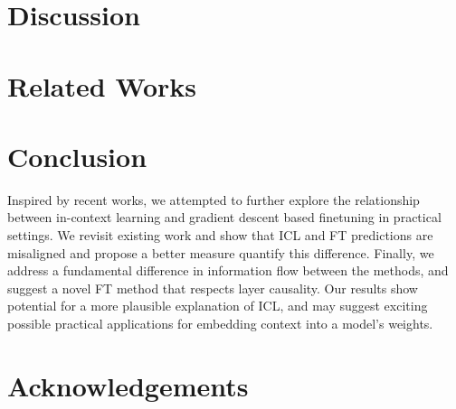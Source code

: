 \documentclass[11pt]{article}
\begin{document}
\section{Discussion}


\section{Related Works} \label{sec:related}


\section{Conclusion}
Inspired by recent works, we attempted to further explore the relationship between in-context learning and gradient descent based finetuning in practical settings.
We revisit existing work and show that ICL and FT predictions are misaligned and propose a better measure quantify this difference.
Finally, we address a fundamental difference in information flow between the methods, and suggest a novel FT method that respects layer causality.
Our results show potential for a more plausible explanation of ICL, and may suggest exciting possible practical applications for embedding context into a model's weights.  
\section{Acknowledgements}





\newpage
\appendix
% 
\end{document}
